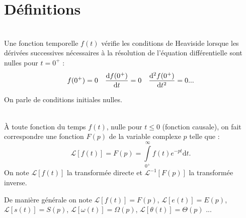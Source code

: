 \documentclass[10pt,fleqn]{article} %
\begin{document}

\vspace{2cm}
\pagestyle{fancy}
\thispagestyle{plain}

\section{Définitions}


\begin{defi} ~\\

Une fonction temporelle $f(t)$ vérifie les conditions de Heaviside lorsque les dérivées successives nécessaires à la résolution de l'équation différentielle sont nulles pour $t={0^{+}}$ :
$$
f({0^{+}})=0 \quad \dfrac{\mathrm{d} f({0^{+}})}{\mathrm{d} t} = 0 \quad \dfrac{\mathrm{d}^2f({0^{+}})}{\mathrm{d} t^2} = 0 ...
$$

On parle de conditions initiales nulles.

\end{defi}

\begin{defi} ~\\
À toute fonction du temps $f(t)$, nulle pour $t\leq0$ (fonction causale), on fait correspondre une fonction $F(p)$ de la variable complexe $p$ telle que :
$$
\mathcal{L}\left[f(t)\right] = F(p)=\int\limits_{0^{+}}^\infty f(t)e^{-pt}\text{d}t.
$$
On note $\mathcal{L}\left[f(t)\right]$ la transformée directe et $\mathcal{L}^{-1}\left[F(p)\right]$ la transformée inverse.

\noindent De manière générale on note 
$\mathcal{L}\left[f(t)\right] = F(p)$,
$\mathcal{L}\left[e(t)\right] = E(p)$,
$\mathcal{L}\left[s(t)\right] = S(p)$,
$\mathcal{L}\left[\omega(t)\right] = \Omega(p)$,
$\mathcal{L}\left[\theta(t)\right] = \Theta(p)$ ...

\end{defi}
\end{document}
